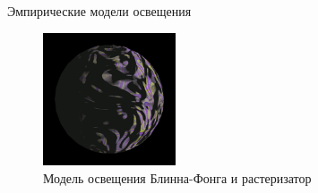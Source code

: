 \documentclass{beamer}
\begin{document}
\begin{frame}{Эмпирические модели освещения}
{			\begin{figure}
				\includegraphics[width=0.35\textwidth]{images/rasterization-example.png}
				\caption{
					 Модель освещения Блинна-Фонга и растеризатор
					}
			\end{figure}

		}
	\end{frame}
	
\end{document}
